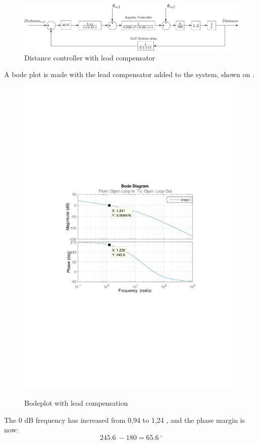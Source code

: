 \begin{figure}[H]
  \centering
    \includegraphics[width=\textwidth]{figures/finalDistanceController.pdf}
  \caption{Distance controller with lead compensator}
  \label{FinalDist}
\end{figure}\vspace{-5mm}
A bode plot is made with the lead compensator added to the system, shown on . 
\begin{figure}[H]
  \centering
  {
    \includegraphics[width=1.2\textwidth]{figures/distanceBode2.pdf}
  }
  \caption{Bodeplot with lead compensation}
  \label{SimulationSteeringB2}
\end{figure}\vspace{-5mm}
The 0 dB frequency has increased from 0,94 \si{} to 1,24 \si{}, and the phase margin is now: $$\SI{245,6}{}-180=\SI{65,6}{^\circ}$$

